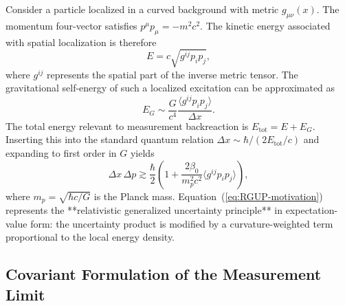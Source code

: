\documentclass[11pt,oneside]{book}
\numberwithin{equation}{chapter}
\begin{document}
Consider a particle localized in a curved background with metric $g_{\mu\nu}(x)$.  
The momentum four-vector satisfies $p^\mu p_\mu = -m^2c^2$.  
The kinetic energy associated with spatial localization is therefore
\begin{equation}
E=c\sqrt{g^{ij}p_i p_j},
\label{eq:curvedE}
\end{equation}
where $g^{ij}$ represents the spatial part of the inverse metric tensor.  
The gravitational self-energy of such a localized excitation can be approximated as
\begin{equation}
E_G\sim \frac{G}{c^4}\frac{\langle g^{ij}p_i p_j\rangle}{\Delta x}.
\label{eq:selfE}
\end{equation}
The total energy relevant to measurement backreaction is $E_{\text{tot}}=E+E_G$.  
Inserting this into the standard quantum relation $\Delta x \sim \hbar/(2E_{\text{tot}}/c)$ and expanding to first order in $G$ yields
\begin{equation}
\Delta x\,\Delta p \gtrsim \frac{\hbar}{2}\!\left(
1+\frac{2\beta_0}{m_p^2c^2}\langle g^{ij}p_i p_j\rangle
\right),
\label{eq:RGUP-motivation}
\end{equation}
where $m_p=\sqrt{\hbar c/G}$ is the Planck mass.  
Equation~(\ref{eq:RGUP-motivation}) represents the **relativistic generalized uncertainty principle** in expectation-value form: the uncertainty product is modified by a curvature-weighted term proportional to the local energy density.

\subsection*{Covariant Formulation of the Measurement Limit}
\end{document}
